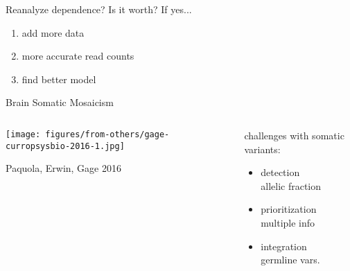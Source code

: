 \documentclass{beamer}
\begin{document}
\begin{frame}{Reanalyze dependence?}
Is it worth? If yes...
\begin{enumerate}
\item add more data
\begin{itemize}
\end{itemize}
\item more accurate read counts
\begin{itemize}
\end{itemize}
\item find better model
\begin{itemize}
\end{itemize}
\end{enumerate}
\end{frame}

\begin{frame}{Brain Somatic Mosaicism}
\begin{columns}[t]
\begin{column}{0.6\textwidth}

\texttt{[image: figures/from-others/gage-curropsysbio-2016-1.jpg]}

{\tiny Paquola, Erwin, Gage 2016}
\end{column}

\begin{column}{0.4\textwidth}
challenges with somatic variants:
\begin{itemize}
\item detection\\
{\footnotesize allelic fraction}
\item prioritization\\{\footnotesize multiple info}
\item integration\\{\footnotesize germline vars.}
\end{itemize}
\end{column}
\end{columns}
\end{frame}
\end{document}
